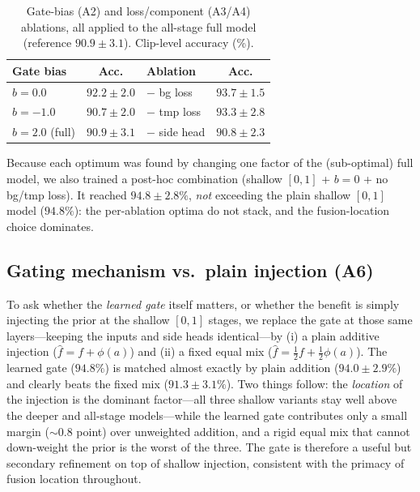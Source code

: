 \documentclass[review,authoryear,times]{elsarticle}
\begin{document}
\begin{table}[t]
\centering
\caption{Gate-bias (A2) and loss/component (A3/A4) ablations, all applied to the
all-stage full model (reference $90.9\pm3.1$). Clip-level accuracy (\%).}
\label{tab:ablation}
\begin{tabular}{lc@{\hskip 2em}lc}
\toprule
Gate bias & Acc. & Ablation & Acc. \\
\midrule
$b=0.0$   & $92.2\pm2.0$ & $-$ bg loss    & $93.7\pm1.5$ \\
$b=-1.0$  & $90.7\pm2.0$ & $-$ tmp loss   & $93.3\pm2.8$ \\
$b=2.0$ (full) & $90.9\pm3.1$ & $-$ side head & $90.8\pm2.3$ \\
\bottomrule
\end{tabular}
\end{table}

Because each optimum was found by changing one factor of the (sub-optimal) full
model, we also trained a post-hoc combination (shallow $[0,1]$ + $b{=}0$ + no
bg/tmp loss). It reached $94.8\pm2.8\%$, \emph{not} exceeding the plain shallow
$[0,1]$ model ($94.8\%$): the per-ablation optima do not stack, and the
fusion-location choice dominates.

\subsection{Gating mechanism vs.\ plain injection (A6)}
\label{sec:gatemech}
To ask whether the \emph{learned gate} itself matters, or whether the benefit is
simply injecting the prior at the shallow $[0,1]$ stages, we replace the gate at
those same layers---keeping the inputs and side heads identical---by (i) a plain
additive injection ($\hat f = f + \phi(a)$) and (ii) a fixed equal mix
($\hat f = \tfrac12 f + \tfrac12\phi(a)$). The learned gate ($94.8\%$) is matched
almost exactly by plain addition ($94.0\pm2.9\%$) and clearly beats the fixed mix
($91.3\pm3.1\%$). Two things follow: the \emph{location} of the injection is the
dominant factor---all three shallow variants stay well above the deeper and
all-stage models---while the learned gate contributes only a small margin
($\sim\!0.8$ point) over unweighted addition, and a rigid equal mix that cannot
down-weight the prior is the worst of the three. The gate is therefore a useful
but secondary refinement on top of shallow injection, consistent with the primacy
of fusion location throughout.
\end{document}
